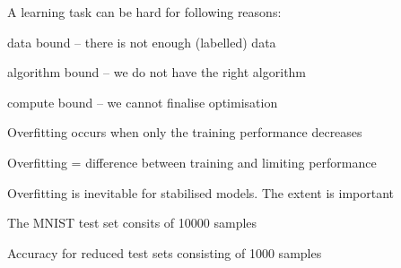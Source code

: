\documentclass[landscape,footrule]{foils}
\begin{document}

A learning task can be hard for following reasons:
\begin{triangles}
\item data bound -- there is not enough (labelled) data
\item algorithm bound -- we do not have the right algorithm
\item compute bound -- we cannot finalise optimisation
\end{triangles}



\begin{triangles}
\item Overfitting occurs when only the training performance decreases
\item Overfitting = difference between training and limiting performance
\item Overfitting is inevitable for stabilised models. The extent is important
\end{triangles}






\enlargethispage{1cm}
\vspace{-3ex}
\begin{triangles}
\item The MNIST test set consits of 10000 samples 
\item Accuracy for reduced test sets consisting of 1000 samples
\end{triangles}

\end{document}
